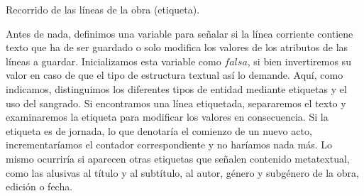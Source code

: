\begin{algorithm}[!ht]
	\caption{Recorrido de las líneas de la obra (etiqueta).}\label{list:normal3}
\end{algorithm}

Antes de nada, definimos una variable para señalar si la línea corriente contiene texto que ha de ser guardado o solo modifica los valores de los atributos de las líneas a guardar. Inicializamos esta variable como $falsa$, si bien invertiremos su valor en caso de que el tipo de estructura textual así lo demande. Aquí, como indicamos, distinguimos los diferentes tipos de entidad mediante etiquetas y el uso del sangrado. Si encontramos una línea etiquetada, separaremos el texto y examinaremos la etiqueta para modificar los valores en consecuencia. Si la etiqueta es de jornada, lo que denotaría el comienzo de un nuevo acto, incrementaríamos el contador correspondiente y no haríamos nada más. Lo mismo ocurriría si aparecen otras etiquetas que señalen contenido metatextual, como las alusivas al título y al subtítulo, al autor, género y subgénero de la obra, edición o fecha.

